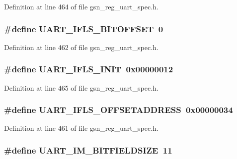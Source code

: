 Definition at line 464 of file gsn\_\-reg\_\-uart\_\-spec.h.

\hypertarget{a00575_afcd21af70825fe0850d7987c64d6913f}{
\subsubsection[{UART\_\-IFLS\_\-BITOFFSET}]{\setlength{\rightskip}{0pt plus 5cm}\#define UART\_\-IFLS\_\-BITOFFSET~0}}
\label{a00575_afcd21af70825fe0850d7987c64d6913f}


Definition at line 462 of file gsn\_\-reg\_\-uart\_\-spec.h.

\hypertarget{a00575_aa4ea3225fc73db61ce13473d8a04ff9f}{
\subsubsection[{UART\_\-IFLS\_\-INIT}]{\setlength{\rightskip}{0pt plus 5cm}\#define UART\_\-IFLS\_\-INIT~0x00000012}}
\label{a00575_aa4ea3225fc73db61ce13473d8a04ff9f}


Definition at line 465 of file gsn\_\-reg\_\-uart\_\-spec.h.

\hypertarget{a00575_aa6911e23d3a4461ec8e372e1e00c3764}{
\subsubsection[{UART\_\-IFLS\_\-OFFSETADDRESS}]{\setlength{\rightskip}{0pt plus 5cm}\#define UART\_\-IFLS\_\-OFFSETADDRESS~0x00000034}}
\label{a00575_aa6911e23d3a4461ec8e372e1e00c3764}


Definition at line 461 of file gsn\_\-reg\_\-uart\_\-spec.h.

\hypertarget{a00575_a8155ddbfbb9ee15cf4ca622dd1549d63}{
\subsubsection[{UART\_\-IM\_\-BITFIELDSIZE}]{\setlength{\rightskip}{0pt plus 5cm}\#define UART\_\-IM\_\-BITFIELDSIZE~11}}
\label{a00575_a8155ddbfbb9ee15cf4ca622dd1549d63}


